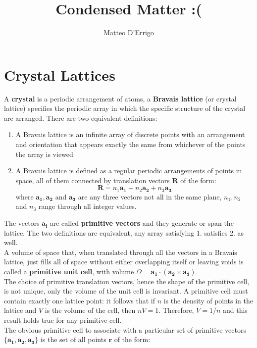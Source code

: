 \documentclass[10.75pt,a4paper,openright,bottom=2cm]{article}
\title{Condensed Matter :(}
\author{Matteo D'Errigo}
\renewcommand{\Vec}[1]{\boldsymbol{#1}}
\begin{document}
\maketitle
\tableofcontents
\newpage
\section{Crystal Lattices}
A \textbf{crystal} is a periodic arrangement of atoms, a \textbf{Bravais lattice} (or crystal lattice) specifies the periodic array in which the specific structure of the crystal are arranged. There are two equivalent definitions:
\begin{enumerate}
    \item A Bravais lattice is an infinite array of discrete points with an arrangement and orientation that appears exactly the same from whichever of the points the array is viewed
    \item A Bravais lattice is defined as a regular periodic arrangements of points in space, all of them connected by translation vectors $\Vec{R}$ of the form:
    \begin{equation}
    \label{R}
    \Vec{R}=n_1\Vec{a_1}+n_2\Vec{a_2}+n_3\Vec{a_3}
    \end{equation}
    where $\Vec{a_1}, \Vec{a_2}$ and $\Vec{a_3}$ are any three vectors not all in the same plane, $n_1, n_2$ and $n_3$ range through all integer values.
\end{enumerate}
The vectors $\Vec{a_i}$ are called \textbf{primitive vectors} and they generate or span the lattice. The two definitions are equivalent, any array satisfying 1. satisfies 2. as well.\\
A volume of space that, when translated through all the vectors in a Bravais lattice, just fills all of space without either overlapping itself or leaving voids is called a \textbf{primitive unit cell}, with volume $\Omega=\Vec{a_1}\cdot(\Vec{a_2}\times\Vec{a_3})$.\\
The choice of primitive translation vectors, hence the shape of the primitive cell, is not unique, only the volume of the unit cell is invariant. A primitive cell must contain exactly one lattice point: it follows that if $n$ is the density of points in the lattice and $V$ is the volume of the cell, then $nV=1$. Therefore, $V=1/n$ and this result holds true for any primitive cell.\\
The obvious primitive cell to associate with a particular set of primitive vectors $\{\Vec{a_1},\Vec{a_2},\Vec{a_3}\}$ is the set of all points $\Vec{r}$ of the form:
\end{document}
